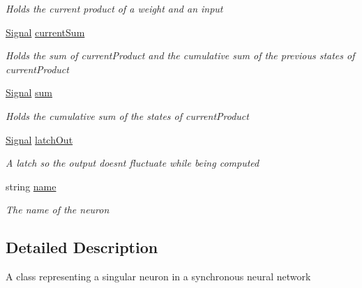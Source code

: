 \begin{DoxyCompactItemize}
\begin{DoxyCompactList}\small\item\em Holds the current product of a weight and an input \end{DoxyCompactList}\item 
\hyperlink{class_n_n_gen_1_1_signal}{Signal} \hyperlink{class_n_n_gen_1_1_sync_neuron_a5414c6e7b74fc581c53f4a5a5ec8bd21}{current\+Sum}
\begin{DoxyCompactList}\small\item\em Holds the sum of current\+Product and the cumulative sum of the previous states of current\+Product \end{DoxyCompactList}\item 
\hyperlink{class_n_n_gen_1_1_signal}{Signal} \hyperlink{class_n_n_gen_1_1_sync_neuron_a025ec7f0da6e80d24e55f23e939afcec}{sum}
\begin{DoxyCompactList}\small\item\em Holds the cumulative sum of the states of current\+Product \end{DoxyCompactList}\item 
\hyperlink{class_n_n_gen_1_1_signal}{Signal} \hyperlink{class_n_n_gen_1_1_sync_neuron_ac80f32363948c3482290c24ef800fb8d}{latch\+Out}
\begin{DoxyCompactList}\small\item\em A latch so the output doesn\textquotesingle{}t fluctuate while being computed \end{DoxyCompactList}\item 
string \hyperlink{class_n_n_gen_1_1_sync_neuron_a52bca099e4e4dca870213d0bdc0a734d}{name}
\begin{DoxyCompactList}\small\item\em The name of the neuron \end{DoxyCompactList}\end{DoxyCompactItemize}


\subsection{Detailed Description}
A class representing a singular neuron in a synchronous neural network 



